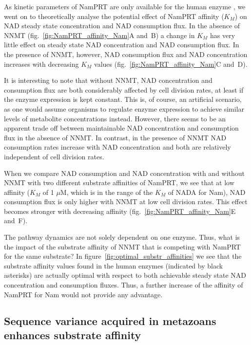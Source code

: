 As kinetic parameters of NamPRT are only available for the human enzyme \cite{Burgos2008}, we went on to theoretically analyse the potential effect of NamPRT affinity ($K_{M}$) on NAD steady state concentration and NAD consumption flux. In the absence of NNMT (fig.~\ref{fig:NamPRT_affinity_Nam}A and~B) a change in $K_{M}$ has very little effect on steady state NAD concentration and NAD consumption flux. In the presence of NNMT, however, NAD consumption flux and NAD concentration increases with decreasing $K_{M}$ values (fig.~\ref{fig:NamPRT_affinity_Nam}C and~D).

It is interesting to note that without NNMT, NAD concentration and consumption flux are both considerably affected by cell division rates, at least if the enzyme expression is kept constant. This is, of course, an artificial scenario, as one would assume organisms to regulate enzyme expression to achieve similar levels of metabolite concentrations instead. However, there seems to be an apparent trade off between maintainable NAD concentration and consumption flux in the absence of NNMT. In contrast,  in the presence of NNMT NAD consumption rates increase with NAD concentration and both are relatively independent of cell division rates. 

When we compare NAD consumption and NAD concentration with and without NNMT with two different substrate affinities of NamPRT, we see that at low affinity ($K_{M}$ of 1 $\mu$M, which is in the range of the $K_{M}$ of NADA for Nam), NAD consumption flux is only higher with NNMT at low cell division rates. This effect becomes stronger with decreasing affinity (fig.~\ref{fig:NamPRT_affinity_Nam}E and~F).

The pathway dynamics are not solely dependent on one enzyme. Thus, what is the impact of the substrate affinity of NNMT that is competing with NamPRT for the same substrate? In figure~\ref{fig:optimal_substr_affinities} we see that the substrate affinity values found in the human enzymes (indicated by black asterisks) are actually optimal with respect to both achievable steady state NAD concentration and consumption fluxes. Thus, a further increase of the affinity of NamPRT for Nam would not provide any advantage.


\subsection{Sequence variance acquired in metazoans enhances substrate affinity}

